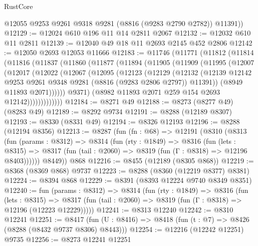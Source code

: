 \begin{lexlean}{RustCore}
\begin{coremodule}
        @12055
        @9253
        @9261
        @9318
        @9281
        (@8816 (@9283 @2790 @2782))
        @11391))
@12129 := @12024 @610 @196 @11 @14 @2811 @2067
@12132 := @12032 @610 @11 @2811
@12139 := @12040 @49 @18 @11 @2693 @2145 @452 @2806
@12142 := @12050 @2693 @12053 @11666
@12183 := @11746
    (@11771
      (@11812
        (@11814
          (@11816
            (@11837
              (@11860
                (@11877
                  (@11894
                    (@11905
                      (@11909
                        (@11995
                          (@12007
                            (@12017
                              (@12022
                                (@12067
                                  (@12095
                                    (@12123
                                      (@12129
                                        (@12132
                                          (@12139
                                            @12142
                                            @9253
                                            @9261
                                            @9348
                                            @9281
                                            (@8816 (@9283 @2806 @2797))
                                            @11391))
                                        (@8949 @11893 @2071))))))
                              @9371)
                            (@8982 @11893 @2071 @259 @154 @2693 @12142)))))))))))))
@12184 := @8271 @49
@12188 := @8273 (@8277 @49) (@8283 @49)
@12189 := @8292 @9734
@12191 := @8288 (@12189 @8307)
@12193 := @8330 (@8331 @49)
@12194 := @8326 @12193
@12196 := @8288 (@12194 @8356)
@12213 := @8287
    (fun (fn : @68) =>
    @12191
      (@8310
        (@8313
          (fun (params : @8312) =>
          @8314
            (fun (rty : @1849) =>
            @8316
              (fun (lets : @8315) =>
              @8317 (fun (tail : @2060) => @8319 (fun (Γ : @8318) => @12196 @8403))))))
        @8449))
    @868
@12216 := @8455 (@12189 (@8305 @868))
@12219 := @8368 (@8369 @868) @9737
@12223 := @8288 (@8360 (@12219 @8377) @8381)
@12224 := @8394 @868
@12229 := @8391 (@8393 @12224 @9740 @8349 @8351)
@12240 := fun (params : @8312) =>
  @8314
    (fun (rty : @1849) =>
    @8316
      (fun (lets : @8315) =>
      @8317 (fun (tail : @2060) => @8319 (fun (Γ : @8318) => @12196 (@12223 @12229)))))
@12241 := @8313 @12240
@12242 := @8310 @12241
@12251 := @8417 (fun (U : @8416) => @8418 (fun (t : @7) => @8426 (@8288 (@8432 @9737 @8306) @8443)))
@12254 := @12216 (@12242 @12251) @9735
@12256 := @8273 @12241 @12251

\end{coremodule}
\end{lexlean}
